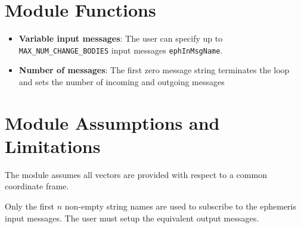 

\section{Module Functions}
\begin{itemize}
	\item \textbf{Variable input messages}: The user can specify up to {\tt MAX\_NUM\_CHANGE\_BODIES} input messages {\tt ephInMsgName}.  
	\item \textbf{Number of messages}: The first zero message string terminates the loop and sets the number of incoming and outgoing messages
\end{itemize}

\section{Module Assumptions and Limitations}
The module assumes all vectors are provided with respect to a common coordinate frame.  

Only the first $n$ non-empty string names are used to subscribe to the ephemeris input messages.  The user must setup the equivalent output messages.  